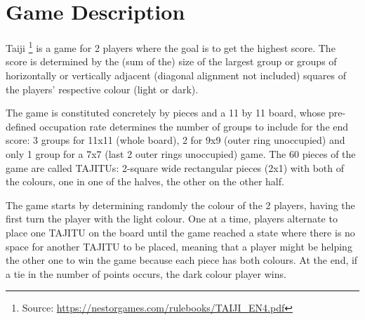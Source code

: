 \chapter{Game Description} \label{game-description}

Taiji \footnote{Source: \url{https://nestorgames.com/rulebooks/TAIJI_EN4.pdf} } is a game for 2 players where the goal is to get the highest score. 
The score is determined by the (sum of the) size of the largest group or groups of horizontally or vertically adjacent (diagonal alignment not included) squares of the players' respective colour (light or dark). 

The game is constituted concretely by pieces and a 11 by 11 board, whose pre-defined occupation rate determines the number of groups to include for the end score: 3 groups for 11x11 (whole board), 2 for 9x9 (outer ring unoccupied) and only 1 group for a 7x7 (last 2 outer rings unoccupied) game.
The 60 pieces of the game are called TAJITUs: 2-square wide rectangular pieces (2x1) with both of the colours, one in one of the halves, the other on the other half.

The game starts by determining randomly the colour of the 2 players, having the first turn the player with the light colour. One at a time, players alternate to place one TAJITU on the board until the game reached a state where there is no space for another TAJITU to be placed, meaning that a player might be helping the other one to win the game because each piece has both colours.
At the end, if a tie in the number of points occurs, the dark colour player wins.


